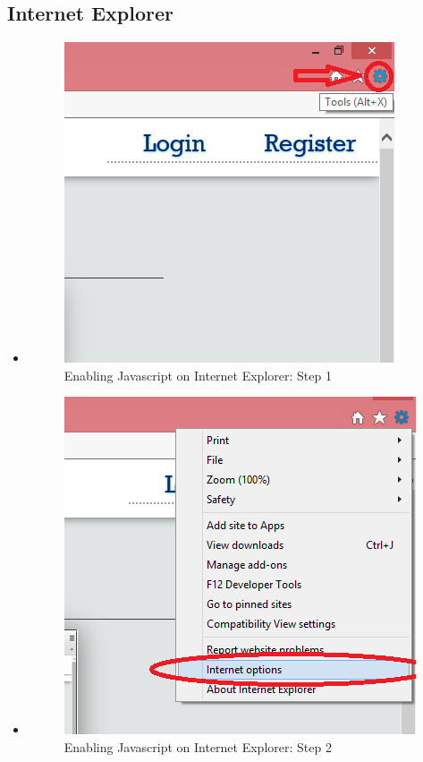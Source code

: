 \subsection{Internet Explorer}
	
	\begin{itemize}
	
	
\item		\begin{figure}[!h]
		\centering
			\includegraphics[scale=0.5]{images/javascriptIE1.png}
			\caption{Enabling Javascript on Internet Explorer: Step 1}
		\end{figure}
		
\item		\begin{figure}[!h]
		\centering
			\includegraphics[scale=0.5]{images/javascriptIE2.png}
			\caption{Enabling Javascript on Internet Explorer: Step 2}
		\end{figure}
		

\end{itemize}
